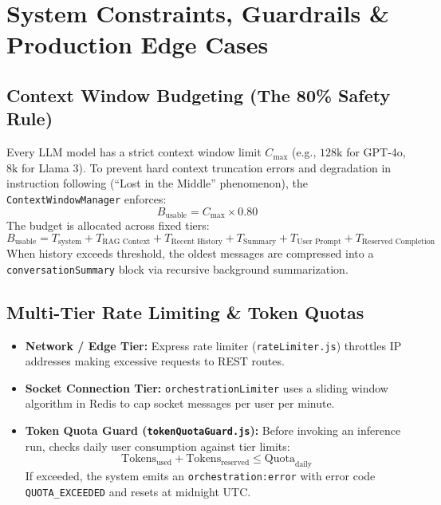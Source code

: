 \documentclass[10pt,a4paper]{article}
\begin{document}
\section{System Constraints, Guardrails \& Production Edge Cases}

\subsection{Context Window Budgeting (The 80\% Safety Rule)}
\begin{constraintbox}
Every LLM model has a strict context window limit $C_{\text{max}}$ (e.g., $128\text{k}$ for GPT-4o, $8\text{k}$ for Llama 3). 
To prevent hard context truncation errors and degradation in instruction following (``Lost in the Middle'' phenomenon), the \texttt{ContextWindowManager} enforces:
\begin{equation}
    B_{\text{usable}} = C_{\text{max}} \times 0.80
\end{equation}
The budget is allocated across fixed tiers:
\begin{equation}
    B_{\text{usable}} = T_{\text{system}} + T_{\text{RAG Context}} + T_{\text{Recent History}} + T_{\text{Summary}} + T_{\text{User Prompt}} + T_{\text{Reserved Completion}}
\end{equation}
When history exceeds threshold, the oldest messages are compressed into a \texttt{conversationSummary} block via recursive background summarization.
\end{constraintbox}

\subsection{Multi-Tier Rate Limiting \& Token Quotas}
\begin{itemize}[leftmargin=*]
    \item \textbf{Network / Edge Tier:} Express rate limiter (\texttt{rateLimiter.js}) throttles IP addresses making excessive requests to REST routes.
    \item \textbf{Socket Connection Tier:} \texttt{orchestrationLimiter} uses a sliding window algorithm in Redis to cap socket messages per user per minute.
    \item \textbf{Token Quota Guard (\texttt{tokenQuotaGuard.js}):} Before invoking an inference run, checks daily user consumption against tier limits:
    \begin{equation*}
        \text{Tokens}_{\text{used}} + \text{Tokens}_{\text{reserved}} \le \text{Quota}_{\text{daily}}
    \end{equation*}
    If exceeded, the system emits an \texttt{orchestration:error} with error code \texttt{QUOTA\_EXCEEDED} and resets at midnight UTC.
\end{itemize}
\end{document}
